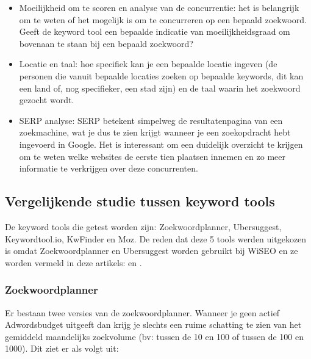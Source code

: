 \begin{itemize}
\item Moeilijkheid om te scoren en analyse van de concurrentie: het is belangrijk om te weten of het mogelijk is om te concurreren op een bepaald zoekwoord. Geeft de keyword tool een bepaalde indicatie van moeilijkheidsgraad om bovenaan te staan bij een bepaald zoekwoord? 
\item Locatie en taal: hoe specifiek kan je een bepaalde locatie ingeven (de personen die vanuit bepaalde locaties zoeken op bepaalde keywords, dit kan een land of, nog specifieker, een stad zijn) en de taal waarin het zoekwoord gezocht wordt. 
\item SERP analyse: SERP betekent simpelweg de resultatenpagina van een zoekmachine, wat je dus te zien krijgt wanneer je een zoekopdracht hebt ingevoerd in Google. Het is interessant om een duidelijk overzicht te krijgen om te weten welke websites de eerste tien plaatsen innemen en zo meer informatie te verkrijgen over deze concurrenten. 
\end{itemize}

\subsection{Vergelijkende studie tussen keyword tools}
\label{ch: Vergelijkende studie tussen keyword tools}

De keyword tools die getest worden zijn: Zoekwoordplanner, Ubersuggest, Keywordtool.io, KwFinder en Moz. De reden dat deze 5 tools werden uitgekozen is omdat Zoekwoordplanner en Ubersuggest worden gebruikt bij WiSEO en ze worden vermeld in deze artikels: \textcite{SEO13} en \textcite{SEOCOMPLETE}. 

\newpage
\subsubsection{Zoekwoordplanner}
\label{ch: Zoekwoordplanner}

Er bestaan twee versies van de zoekwoordplanner. Wanneer je geen actief Adwordsbudget uitgeeft dan krijg je slechts een ruime schatting te zien van het gemiddeld maandelijks zoekvolume (bv: tussen de 10 en 100 of tussen de 100 en 1000). Dit ziet er als volgt uit:  


